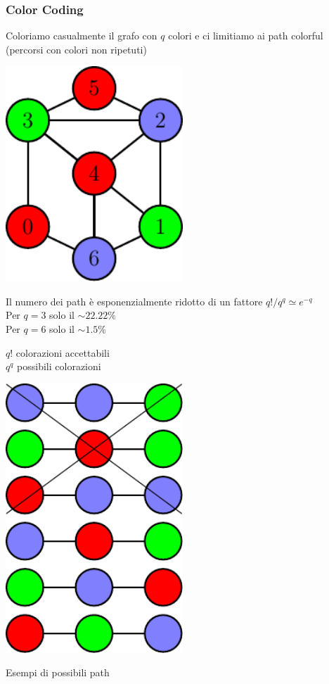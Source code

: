 \begin{frame}
	\frametitle{Color Coding}
	\centering


		\begin{minipage}{.45\textwidth}
			\centering
			Coloriamo casualmente il grafo con $q$ colori e ci limitiamo ai path colorful 
			(percorsi con colori non ripetuti)
			\medskip
			
			\includegraphics[width=0.5\textwidth]{images/8_cc_graph}
			
			\small
			\medskip
			
			Il numero dei path è esponenzialmente ridotto di un fattore $q! / q^q \simeq e^{-q}$\\
			 
			Per $q=3$ solo il $\sim22.22\%$\\
			Per $q=6$ solo il $\sim1.5\%$\phantom{$22$}
		\end{minipage}\hfill
		\begin{minipage}{.45\textwidth}
			\centering
			$q!$ colorazioni accettabili\\
			$q^q$ possibili colorazioni
			
			\medskip
			
			\includegraphics[width=0.5\textwidth]{images/8_cc_list}
			
			Esempi di possibili path
			\hfill
		\end{minipage}\hfill

\end{frame}

